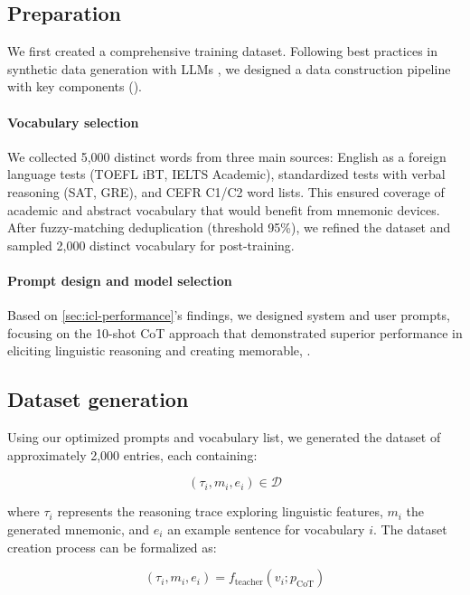 \subsection{Preparation} \label{sec:data-prep}
We first created a comprehensive training dataset. Following best practices in synthetic data generation with LLMs \citetext{\citealp{longLLMsDrivenSyntheticData2024b}, \citealp{openthoughtsteamOpenThoughts2025}}, we designed a data construction pipeline with key components ().

\paragraph*{Vocabulary selection} We collected 5,000 distinct words from three main sources: English as a foreign language tests (TOEFL iBT, IELTS Academic), standardized tests with verbal reasoning (SAT, GRE), and CEFR C1/C2 word lists. This ensured coverage of academic and abstract vocabulary that would benefit from mnemonic devices. After fuzzy-matching deduplication (threshold 95\%), we refined the dataset and sampled 2,000 distinct vocabulary for post-training.

\paragraph*{Prompt design and model selection} Based on \cref{sec:icl-performance}'s findings, we designed system and user prompts, focusing on the 10-shot CoT approach that demonstrated superior performance in eliciting linguistic reasoning and creating memorable, \lgms.

\subsection{Dataset generation} \label{sec:data-gen}

Using our optimized prompts and vocabulary list, we generated the \links dataset of approximately 2,000 entries, each containing:

\begin{equation}
(\tau_i, m_i, e_i) \in \mathcal{D}
\end{equation}

where $\tau_i$ represents the reasoning trace exploring linguistic features, $m_i$ the generated mnemonic, and $e_i$ an example sentence for vocabulary $i$. The dataset creation process can be formalized as:

\begin{equation}
(\tau_i, m_i, e_i) = f_{\text{teacher}}(v_i; p_{\text{CoT}})
\end{equation}

